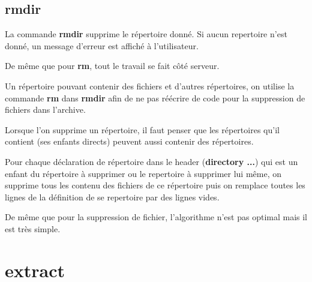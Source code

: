 \documentclass[titlepage]{article}
\begin{document}
	\subsection{rmdir}

	La commande \textbf{rmdir} supprime le répertoire donné. Si aucun repertoire n'est donné, un message d'erreur est affiché à l'utilisateur.

	De même que pour \textbf{rm}, tout le travail se fait côté serveur.

	Un répertoire pouvant contenir des fichiers et d'autres répertoires, on utilise la commande \textbf{rm} dans \textbf{rmdir} afin de ne pas réécrire de code pour la suppression de fichiers dans l'archive.

	Lorsque l'on supprime un répertoire, il faut penser que les répertoires qu'il contient (ses enfants directs) peuvent aussi contenir des répertoires. 

	Pour chaque déclaration de répertoire dans le header (\textbf{directory ...}) qui est un enfant du répertoire à supprimer ou le repertoire à supprimer lui même, on supprime tous les contenu des fichiers de ce répertoire puis on remplace toutes les lignes de la définition de se repertoire par des lignes vides.

	De même que pour la suppression de fichier, l'algorithme n'est pas optimal mais il est très simple.  

	\section{extract}
\end{document}
